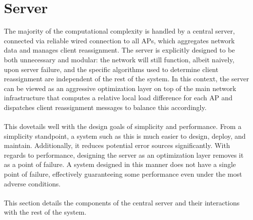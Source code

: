 \documentclass[10pt,journal,compsoc]{IEEEtran}
\begin{document}
		\section{Server}
		The majority of the computational complexity is handled by a central server, connected via reliable wired connection to all APs, which aggregates network data and manages client reassignment. The server is explicitly designed to be both unnecessary and modular: the network will still function, albeit naively, upon server failure, and the specific algorithms used to determine client reassignment are independent of the rest of the system. In this context, the server can be viewed as an aggressive optimization layer on top of the main network infrastructure that computes a relative local load difference for each AP and dispatches client reassignment messages to balance this accordingly. \\
		\\
		This dovetails well with the design goals of simplicity and performance. From a simplicity standpoint, a system such as this is much easier to design, deploy, and maintain. Additionally, it reduces potential error sources significantly. With regards to performance, designing the server as an optimization layer removes it as a point of failure. A system designed in this manner does not have a single point of failure, effectively guaranteeing some performance even under the most adverse conditions.\\
		\\
		This section details the components of the central server and their interactions with the rest of the system.
		
\end{document}
